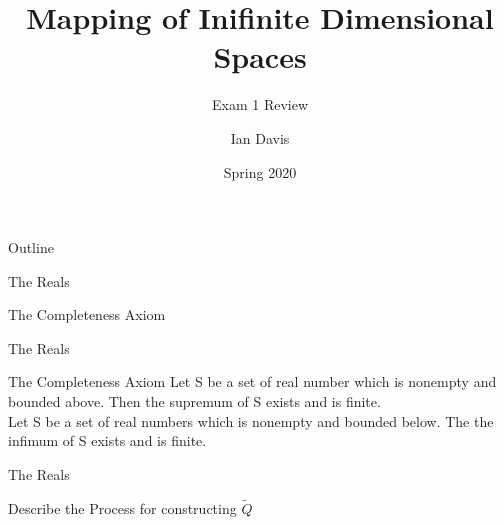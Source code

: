 \documentclass{beamer}
\title[Math 8210: Review 1] %
{Mapping of Inifinite Dimensional Spaces}
\subtitle
{Exam 1 Review}
\author[Davis, 2020] %
{Ian Davis\inst{1}}
\institute[Clemson University] %
{
  \inst{1}%
  John E. Walker Department of Economics\\
  Clemson University
  }
\date[Spring 2020] %
{Spring 2020}
\begin{document}
\begin{frame}
  \titlepage
\end{frame}

\begin{frame}{Outline}
  \tableofcontents
\end{frame}





\begin{frame}{The Reals}

	\begin{block}{The Completeness Axiom}
	\end{block}

\end{frame}
\begin{frame}{The Reals}
	\begin{block}{The Completeness Axiom}
		Let S be a set of real number which is nonempty and bounded above. Then the supremum of S exists and is finite.\\
		Let S be a set of real numbers which is nonempty and bounded below. The the infimum of S exists and is finite.
	\end{block}
\end{frame}

\begin{frame}{The Reals}

	\begin{block}{Describe the Process for constructing $\widetilde{Q}$}
        \end{block}

\end{frame}
\end{document}
